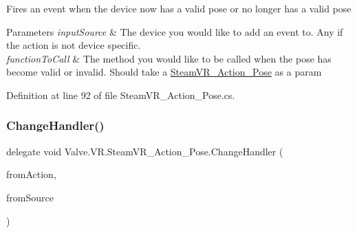 Fires an event when the device now has a valid pose or no longer has a valid pose 


\begin{DoxyParams}{Parameters}
{\em input\+Source} & The device you would like to add an event to. Any if the action is not device specific.\\
\hline
{\em function\+To\+Call} & The method you would like to be called when the pose has become valid or invalid. Should take a \mbox{\hyperlink{class_valve_1_1_v_r_1_1_steam_v_r___action___pose}{Steam\+V\+R\+\_\+\+Action\+\_\+\+Pose}} as a param\\
\hline
\end{DoxyParams}


Definition at line 92 of file Steam\+V\+R\+\_\+\+Action\+\_\+\+Pose.\+cs.

\mbox{\label{class_valve_1_1_v_r_1_1_steam_v_r___action___pose_ac9415e6ad971e70311f59ff1bfb4ea76}} 
\subsubsection{\texorpdfstring{ChangeHandler()}{ChangeHandler()}}
{\footnotesize\ttfamily delegate void Valve.\+V\+R.\+Steam\+V\+R\+\_\+\+Action\+\_\+\+Pose.\+Change\+Handler (\begin{DoxyParamCaption}\item[{\mbox{\hyperlink{class_valve_1_1_v_r_1_1_steam_v_r___action___pose}{Steam\+V\+R\+\_\+\+Action\+\_\+\+Pose}}}]{from\+Action,  }\item[{\mbox{\hyperlink{namespace_valve_1_1_v_r_a82e5bf501cc3aa155444ee3f0662853f}{Steam\+V\+R\+\_\+\+Input\+\_\+\+Sources}}}]{from\+Source }\end{DoxyParamCaption})}

\mbox{\label{class_valve_1_1_v_r_1_1_steam_v_r___action___pose_a40c6d9862680e8c99781b3a109d94b82}} 

